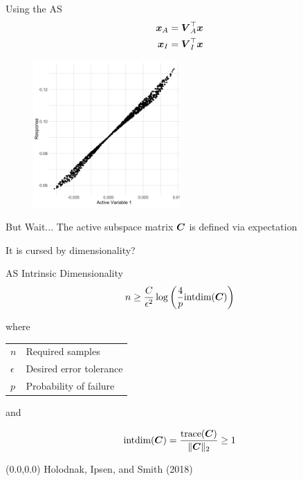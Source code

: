 \documentclass[14pt]{beamer}
\begin{document}
\begin{frame}{Using the AS}
  \begin{equation*} \begin{aligned}
      \boldsymbol{x}_A &= \boldsymbol{V}_A^{\top}\boldsymbol{x} \\
      \boldsymbol{x}_I &= \boldsymbol{V}_I^{\top}\boldsymbol{x}
  \end{aligned} \end{equation*}

  \begin{figure}
    \centering
    \includegraphics[width=0.5\textwidth]{../images/as_summary_nat}
  \end{figure}
\end{frame}

\begin{frame}{But Wait...}
  The active subspace matrix $\boldsymbol{C}$ is defined via expectation

  \bigskip It is cursed by dimensionality?
\end{frame}

\begin{frame}{AS Intrinsic Dimensionality}
  \begin{equation*}
    n \geq \frac{C}{\epsilon^2}\log\left(\frac{4}{p}\text{intdim}(\boldsymbol{C})\right)
  \end{equation*}

  where

  \begin{table}
    \centering
    \begin{tabular}{@{}ll@{}}
      $n$ & Required samples \\
      $\epsilon$ & Desired error tolerance \\
      $p$ & Probability of failure
    \end{tabular}
  \end{table}

  and

  \begin{equation*}
    \text{intdim}(\boldsymbol{C}) = \frac{\text{trace}(\boldsymbol{C})}{\|\boldsymbol{C}\|_2} \geq 1
  \end{equation*}

  \begin{textblock}{5}(0.0,0.0)
    {\tiny Holodnak, Ipsen, and Smith (2018)}
  \end{textblock}
\end{frame}
\end{document}
